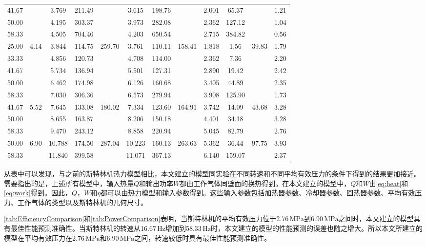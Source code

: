 \begin{table}
\begin{tabular}{cccccccccccc}
		41.67	&&3.769	&211.49	&&3.615	&198.76	&&2.001	&65.37	&&1.21\\
		50.00	&&4.195	&303.37	&&3.973	&282.08	&&2.362	&127.12	&&1.04\\
		58.33	&&4.505	&704.46	&&4.203	&650.54	&&2.715	&384.82	&&0.56\\
		\midrule
		25.00	&\multirow{5}{*}{4.14}	&3.844	&114.75	&\multirow{5}{*}{259.70}	&3.761	&110.11	&\multirow{5}{*}{158.41}	&1.818	&1.56	&\multirow{5}{*}{39.83}	&1.79\\
		33.33	&&4.856	&120.73	&&4.708	&114.00	&&2.362	&7.36	&&2.20\\
		41.67	&&5.734	&136.94	&&5.501	&127.31	&&2.890	&19.42	&&2.42\\
		50.00	&&6.462	&174.98	&&6.126	&160.68	&&3.405	&44.89	&&2.35\\
		58.33	&&7.030	&306.36	&&6.573	&279.94	&&3.908	&125.90	&&1.73\\
		\midrule
		41.67	&\multirow{3}{*}{5.52}	&7.645	&133.08	&\multirow{3}{*}{180.02}	&7.334	&123.60	&\multirow{3}{*}{164.91}	&3.742	&14.09	&\multirow{3}{*}{43.68}	&3.28\\
		50.00	&&8.655	&163.87	&&8.206	&150.18	&&4.401	&34.18	&&3.28\\
		58.33	&&9.470	&243.12	&&8.858	&220.94	&&5.045	&82.79	&&2.76\\
		\midrule
		50.00	&\multirow{2}{*}{6.90}	&10.788	&174.50	&\multirow{2}{*}{287.04}	&10.223	&160.13	&\multirow{2}{*}{263.63}	&5.362	&36.44	&\multirow{2}{*}{97.75}		&3.93\\
		58.33	&&11.840	&399.58	&&11.071	&367.13	&&6.140	&159.07	&&2.37\\
		\bottomrule
	\end{tabular}
	\label{tab:PowerComparison}
\end{table}

从表中可以发现，与之前的斯特林机热力模型相比，本文建立的模型同实验在不同转速和不同平均有效压力的条件下得到的结果更加接近。需要指出的是，上述所有模型中，输入热量$Q$和输出功率$W$都由工作气体同壁面的换热得到。在本文建立的模型中，$Q$和$W$由\autoref{eq:heat}和\autoref{eq:work}得到。因此，$Q$，$W$和$\eta$都可以由热力模型和输入参数得到。这些输入参数包括加热器参数、冷却器参数、回热器参数、平均有效压力、工作气体的类型以及斯特林机的几何尺寸。

\autoref{tab:EfficiencyComparison}和\autoref{tab:PowerComparison}表明，当斯特林机的平均有效压力位于2.76$\,\mathrm{MPa}$到6.90$\,\mathrm{MPa}$之间时，本文建立的模型具有最佳性能预测准确性。当斯特林机的转速从16.67$\,\mathrm{Hz}$增加到58.33$\,\mathrm{Hz}$时，本文建立的模型的性能预测的误差也随之增大。所以本文所建立的模型在平均有效压力在2.76$\,\mathrm{MPa}$和6.90$\,\mathrm{MPa}$之间，转速较低时具有最佳性能预测准确性。

